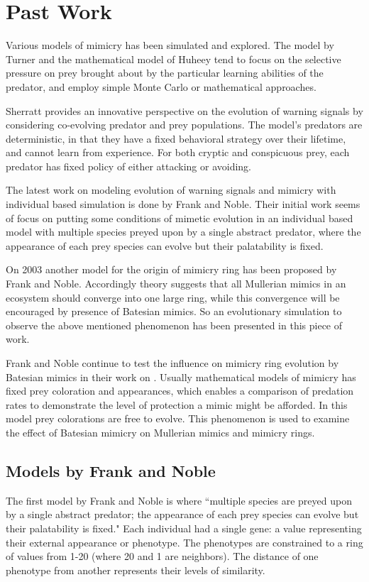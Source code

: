 \section{Past Work}
Various models of mimicry has been simulated and explored. The model by Turner \cite{turner1996} and the mathematical model of Huheey \cite{huheey1988} tend to focus on the selective pressure on prey brought about by the particular learning abilities of the predator, and employ simple Monte Carlo or mathematical approaches.

Sherratt \cite{sherratt2002} provides an innovative perspective on the evolution of warning signals by considering co-evolving predator and prey populations. The model's predators are deterministic, in that they have a fixed behavioral strategy over their lifetime, and cannot learn from experience. For both cryptic and conspicuous prey, each predator has fixed policy of either attacking or avoiding.

The latest work on modeling evolution of warning signals and mimicry with individual based simulation is done by Frank and Noble. Their initial work \cite{franks2002} seems of focus on putting some conditions of mimetic evolution in an individual based model with multiple species preyed upon by a single abstract predator, where the appearance of each prey species can evolve but their palatability is fixed.

On 2003 \cite{franks2003} another model for the origin of mimicry ring has been proposed by Frank and Noble. Accordingly theory suggests that all Mullerian mimics in an ecosystem should converge into one large ring, while this convergence will be encouraged by presence of Batesian mimics. So an evolutionary simulation to observe the above mentioned phenomenon has been presented in this piece of work.

Frank and Noble continue to test the influence on mimicry ring evolution by Batesian mimics in their work on \cite{franks2004}. Usually mathematical models of mimicry has fixed prey coloration and appearances, which enables a comparison of predation rates to demonstrate the level of protection a mimic might be afforded. In this model prey colorations are free to evolve. This phenomenon is used to examine the effect of Batesian mimicry on Mullerian mimics and mimicry rings. 

\subsection{Models by Frank and Noble}
The first model by Frank and Noble \cite{franks2002} is where ``multiple species are preyed upon by a single abstract predator; the appearance of each prey species can evolve but their palatability is fixed." Each individual had a single gene: a value representing their external appearance or phenotype. The phenotypes are constrained to a ring of values from 1-20 (where 20 and 1 are neighbors). The distance of one phenotype from another represents their levels of similarity. 

